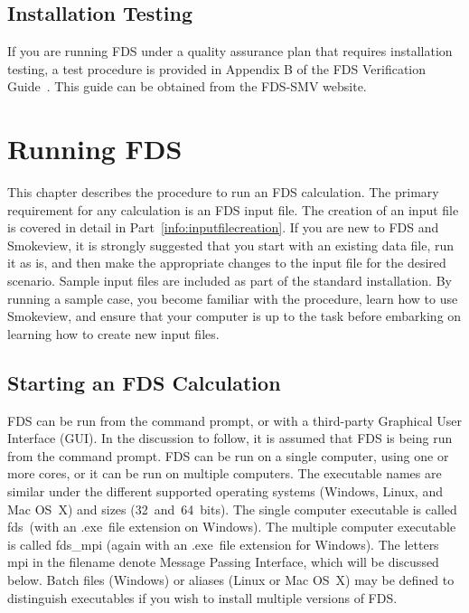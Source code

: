 \documentclass[11pt]{book}
\begin{document}
\section{Installation Testing}

If you are running FDS under a quality assurance plan that requires installation testing, a test procedure is provided in Appendix B of the FDS Verification Guide~\cite{FDS_Verification_Guide}.  This guide can be obtained from the FDS-SMV website.



\chapter{Running FDS}
\label{info:runningFDS}

This chapter describes the procedure to run an FDS calculation. The primary requirement for any calculation is an FDS input file. The creation of an input file is covered in detail in Part~\ref{info:inputfilecreation}. If you are new to FDS and Smokeview, it is strongly suggested that you start with an existing data file, run it as is, and then make the appropriate changes to the input file for the desired scenario. Sample input files are included as part of the standard installation. By running a sample case, you become familiar with the procedure, learn how to use Smokeview, and ensure that your computer is up to the task before embarking on learning how to create new input files.



\section{Starting an FDS Calculation}

FDS can be run from the command prompt, or with a third-party Graphical User Interface (GUI). In the discussion to follow, it is assumed that FDS is being run from the command prompt. FDS can be run on a single computer, using one or more cores, or it can be run on multiple computers. The executable names are similar under the different supported operating systems (Windows, Linux, and Mac OS~X) and sizes (32~and~64~bits). The single computer executable is called {\ct fds}\ (with an {\ct .exe}\ file extension on Windows).  The multiple computer executable is called {\ct fds\_mpi} (again with an {\ct .exe}\ file extension for Windows). The letters {\ct mpi} in the filename denote Message Passing Interface, which will be discussed below.  Batch files (Windows) or aliases (Linux or Mac OS~X) may be defined to distinguish executables if you wish to install multiple versions of FDS.
\end{document}
